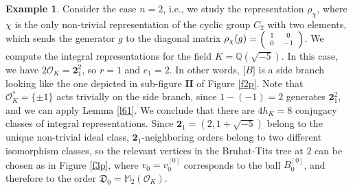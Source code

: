\documentclass{article}
\theoremstyle{definition}
\newtheorem{ex}[Prop]{Example}
\theoremstyle{remark}
\newcommand\sbmattrix[4]{\textnormal{\scriptsize$\left(\begin{array}{cc}#1&#2\\#3&#4\end{array}\right)$\normalsize}}
\begin{document}
\begin{ex}\label{e67}
    Consider the case $n=2$, i.e., we study the representation
    $\rho_\chi$, where $\chi$ is the only non-trivial 
    representation of the cyclic group $C_2$ with two
    elements, which sends the generator $g$ to the diagonal
    matrix $\rho_{\chi}(g)=\sbmattrix100{-1}$. We compute 
    the integral representations for the field
   $K=\mathbb{Q}(\sqrt{-5} )$. In this case, we have
   $2\mathcal{O}_K=\mathbf{2}^{2}_1$, so $r=1$ and $e_1=2$.
   In other words, $\mathbb[B]$ is a side branch looking
   like the one depicted in sub-figure $\mathbf{II}$ of
   Figure \ref{f2p}. 
   Note that $\mathcal{O}_K^*=\{\pm1\}$ acts trivially
   on the side branch, since $1-(-1)=2$ generates 
   $\mathbf{2}^{2}_1$, and we can apply Lemma \ref{l61}.
   We conclude that there are $4h_K=8$ conjugacy classes
   of integral representations.
   Since $\mathbf{2}_1=(2,1+\sqrt{-5})$ belong to the unique
   non-trivial ideal class, $\mathbf{2}_1$-neighboring orders
   belong to two different isomorphism classes, so the relevant
   vertices in the Bruhat-Tits tree at $2$ can be chosen as in 
   Figure \ref{f3p}, where $v_0=v_0^{[0]}$ corresponds 
   to the ball 
   $B_0^{[0]}$, and therefore to the order $\mathfrak{D}_0=\mathbb{M}_2(\mathcal{O}_K)$.
   


\end{ex}
\end{document}
